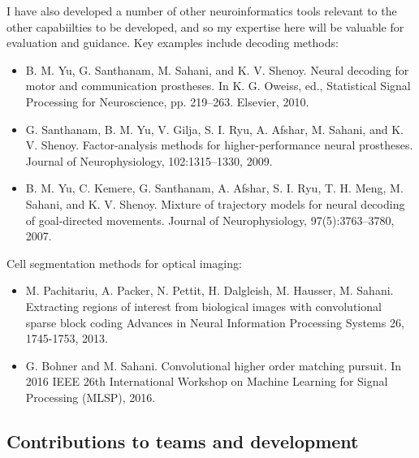 {I have also developed a number of other neuroinformatics tools
relevant to the other capabiilties to be developed, and so my
expertise here will be valuable for evaluation and guidance.
%
Key examples include  decoding methods:
\begin{itemize}[topsep=0pt,itemsep=0pt]
  \item B. M. Yu, G. Santhanam, M. Sahani, and K. V. Shenoy.
Neural decoding for motor and communication prostheses.
In K. G. Oweiss, ed., Statistical Signal Processing for Neuroscience,
pp. 219–263. Elsevier, 2010.
\item G. Santhanam, B. M. Yu, V. Gilja, S. I. Ryu, A. Afshar, M. Sahani, and K. V. Shenoy.
Factor-analysis methods for higher-performance neural prostheses.
Journal of Neurophysiology, 102:1315–1330, 2009. 
\item B. M. Yu, C. Kemere, G. Santhanam, A. Afshar, S. I. Ryu, T. H. Meng, M. Sahani, and K. V. Shenoy.
Mixture of trajectory models for neural decoding of goal-directed movements.
Journal of Neurophysiology, 97(5):3763–3780, 2007. 
\end{itemize}
Cell segmentation methods for optical imaging:
\begin{itemize}[topsep=0pt,itemsep=0pt]
    \item M. Pachitariu, A. Packer, N. Pettit, H. Dalgleish, M. Hausser, M. Sahani.
    Extracting regions of interest from biological images with convolutional sparse block coding
    Advances in Neural Information Processing Systems 26, 1745-1753,
    2013.
  \item G. Bohner and M. Sahani.
    Convolutional higher order matching pursuit.
    In 2016 IEEE 26th International Workshop on Machine Learning for
    Signal Processing (MLSP), 2016.
\end{itemize}






\subsection{Contributions to teams and development}

}
